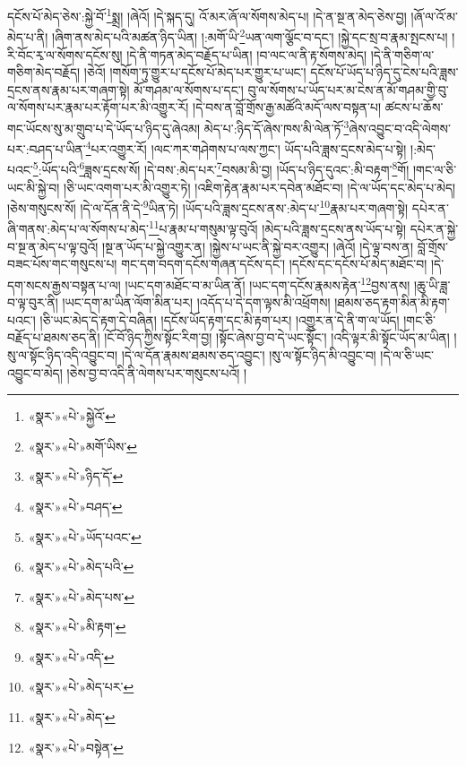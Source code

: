 དངོས་པོ་མེད་ཅེས་:སྐྱེ་བོ་\footnote{«སྣར་»«པེ་»སྐྱེའོ་}སྨྲ། །ཞེའོ། །དེ་སྐད་དུ། འོ་མར་ཞོ་ལ་སོགས་མེད་པ། །དེ་ན་སྔ་ན་མེད་ཅེས་བྱ། །ཞོ་ལ་འོ་མ་མེད་པ་ནི། །ཞིག་ནས་མེད་པའི་མཚན་ཉིད་ཡིན། །:མགོ་ཡི་\footnote{«སྣར་»«པེ་»མགོ་ཡིས་}ཡན་ལག་ལྕོང་བ་དང་། །སྐྱེ་དང་སྲ་བ་རྣམ་སྤངས་པ། །རི་བོང་རྭ་ལ་སོགས་དངོས་སུ། །དེ་ནི་གཏན་མེད་བརྗོད་པ་ཡིན། །བ་ལང་ལ་ནི་རྟ་སོགས་མེད། །དེ་ནི་གཅིག་ལ་གཅིག་མེད་བརྗོད། །ཅེའོ། །གསོག་ཏུ་གྱུར་པ་དངོས་པོ་མེད་པར་གྱུར་པ་ཡང་། དངོས་པོ་ཡོད་པ་ཉིད་དུ་ངེས་པའི་ཟླས་དྲངས་ནས་རྣམ་པར་གཞག་སྟེ། མོ་གཤམ་ལ་སོགས་པ་དང་། བུ་ལ་སོགས་པ་ཡོད་པར་མ་ངེས་ན་མོ་གཤམ་གྱི་བུ་ལ་སོགས་པར་རྣམ་པར་རྟོག་པར་མི་འགྱུར་རོ། །དེ་བས་ན་བློ་གྲོས་རྒྱ་མཚོའི་མདོ་ལས་བསྟན་པ། ཚངས་པ་ཆོས་གང་ཡོངས་སུ་མ་གྲུབ་པ་དེ་ཡོད་པ་ཉིད་དུ་ཞེའམ། མེད་པ་:ཉིད་དོ་ཞེས་ཁས་མི་ལེན་ཏོ་\footnote{«སྣར་»«པེ་»ཉིད་དོ་}ཞེས་འབྱུང་བ་འདི་ལེགས་པར་:བཤད་པ་ཡིན་\footnote{«སྣར་»«པེ་»བཤད་}པར་འགྱུར་རོ། །ལང་ཀར་གཤེགས་པ་ལས་ཀྱང་། ཡོད་པའི་ཟླས་དྲངས་མེད་པ་སྟེ། །:མེད་པའང་\footnote{«སྣར་»«པེ་»ཡོད་པའང་}:ཡོད་པའི་\footnote{«སྣར་»«པེ་»མེད་པའི་}ཟླས་དྲངས་སོ། །དེ་བས་:མེད་པར་\footnote{«སྣར་»«པེ་»མེད་པས་}བསམ་མི་བྱ། །ཡོད་པ་ཉིད་དུའང་:མི་བརྟག་\footnote{«སྣར་»«པེ་»མི་རྟག་}གོ། །གང་ལ་ཅི་ཡང་མི་སྐྱེ་བ། །ཅི་ཡང་འགག་པར་མི་འགྱུར་ཏེ། །འཇིག་རྟེན་རྣམ་པར་དབེན་མཐོང་བ། །དེ་ལ་ཡོད་དང་མེད་པ་མེད། །ཅེས་གསུངས་སོ། །དེ་ལ་དོན་ནི་དེ་\footnote{«སྣར་»«པེ་»འདི་}ཡིན་ཏེ། །ཡོད་པའི་ཟླས་དྲངས་ནས་:མེད་པ་\footnote{«སྣར་»«པེ་»མེད་པར་}རྣམ་པར་གཞག་སྟེ། དཔེར་ན་ཞི་གནས་:མེད་པ་ལ་སོགས་པ་མེད་\footnote{«སྣར་»«པེ་»མེད་}པ་རྣམ་པ་གསུམ་ལྟ་བུའོ། །མེད་པའི་ཟླས་དྲངས་ནས་ཡོད་པ་སྟེ། དཔེར་ན་སྐྱེ་བ་སྔ་ན་མེད་པ་ལྟ་བུའོ། །སྔ་ན་ཡོད་པ་སྐྱེ་འགྱུར་ན། །སྐྱེས་པ་ཡང་ནི་སྐྱེ་བར་འགྱུར། །ཞེའོ། །དེ་ལྟ་བས་ན། བློ་གྲོས་བཟང་པོས་གང་གསུངས་པ། གང་དག་བདག་དངོས་གཞན་དངོས་དང་། །དངོས་དང་དངོས་པོ་མེད་མཐོང་བ། །དེ་དག་སངས་རྒྱས་བསྟན་པ་ལ། །ཡང་དག་མཐོང་བ་མ་ཡིན་ནོ། །ཡང་དག་དངོས་རྣམས་རྟེན་\footnote{«སྣར་»«པེ་»བསྟེན་}བྱས་ནས། །ཆུ་ཡི་ཟླ་བ་ལྟ་བུར་ནི། །ཡང་དག་མ་ཡིན་ལོག་མིན་པར། །འདོད་པ་དེ་དག་ལྟས་མི་འཕྲོགས། །ཐམས་ཅད་རྟག་མིན་མི་རྟག་པའང་། །ཅི་ཡང་མེད་དེ་རྟག་དེ་བཞིན། །དངོས་ཡོད་རྟག་དང་མི་རྟག་པར། །འགྱུར་ན་དེ་ནི་ག་ལ་ཡོད། །གང་ཅི་བརྗོད་པ་ཐམས་ཅད་ནི། །ངོ་བོ་ཉིད་ཀྱིས་སྟོང་རིག་བྱ། །སྟོང་ཞེས་བྱ་བ་དེ་ཡང་སྟོང་། །འདི་ལྟར་མི་སྟོང་ཡོད་མ་ཡིན། །སུ་ལ་སྟོང་ཉིད་འདི་འབྱུང་བ། །དེ་ལ་དོན་རྣམས་ཐམས་ཅད་འབྱུང་། །སུ་ལ་སྟོང་ཉིད་མི་འབྱུང་བ། །དེ་ལ་ཅི་ཡང་འབྱུང་བ་མེད། །ཅེས་བྱ་བ་འདི་ནི་ལེགས་པར་གསུངས་པའོ། །
